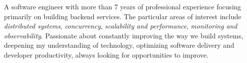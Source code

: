 

\begin{cvparagraph}

	A software engineer with more than 7 years of professional experience focusing primarily on building backend services. The particular areas of interest include {\textit{distributed systems}}, {\textit{concurrency}}, {\textit{scalability and performance}}, {\textit{monitoring and observability}}. Passionate about constantly improving the way we build systems, deepening my understanding of technology, optimizing software delivery and developer productivity, always looking for opportunities to improve.

\end{cvparagraph}
